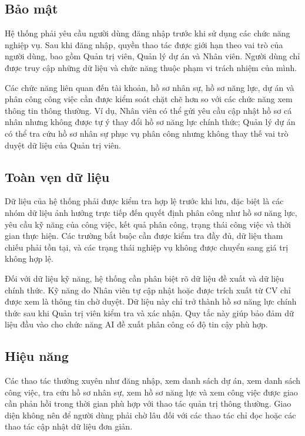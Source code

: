 \documentclass[../DoAn.tex]{subfiles}
\begin{document}
\subsection{Bảo mật}
\label{subsection:2.4.1}
Hệ thống phải yêu cầu người dùng đăng nhập trước khi sử dụng các chức năng nghiệp vụ. Sau khi đăng nhập, quyền thao tác được giới hạn theo vai trò của người dùng, bao gồm Quản trị viên, Quản lý dự án và Nhân viên. Người dùng chỉ được truy cập những dữ liệu và chức năng thuộc phạm vi trách nhiệm của mình.

Các chức năng liên quan đến tài khoản, hồ sơ nhân sự, hồ sơ năng lực, dự án và phân công công việc cần được kiểm soát chặt chẽ hơn so với các chức năng xem thông tin thông thường. Ví dụ, Nhân viên có thể gửi yêu cầu cập nhật hồ sơ cá nhân nhưng không được tự ý thay đổi hồ sơ năng lực chính thức; Quản lý dự án có thể tra cứu hồ sơ nhân sự phục vụ phân công nhưng không thay thế vai trò duyệt dữ liệu của Quản trị viên.

\subsection{Toàn vẹn dữ liệu}
\label{subsection:2.4.2}
Dữ liệu của hệ thống phải được kiểm tra hợp lệ trước khi lưu, đặc biệt là các nhóm dữ liệu ảnh hưởng trực tiếp đến quyết định phân công như hồ sơ năng lực, yêu cầu kỹ năng của công việc, kết quả phân công, trạng thái công việc và thời gian thực hiện. Các trường bắt buộc cần được kiểm tra đầy đủ, dữ liệu tham chiếu phải tồn tại, và các trạng thái nghiệp vụ không được chuyển sang giá trị không hợp lệ.

Đối với dữ liệu kỹ năng, hệ thống cần phân biệt rõ dữ liệu đề xuất và dữ liệu chính thức. Kỹ năng do Nhân viên tự cập nhật hoặc được trích xuất từ CV chỉ được xem là thông tin chờ duyệt. Dữ liệu này chỉ trở thành hồ sơ năng lực chính thức sau khi Quản trị viên kiểm tra và xác nhận. Quy tắc này giúp bảo đảm dữ liệu đầu vào cho chức năng AI đề xuất phân công có độ tin cậy phù hợp.

\subsection{Hiệu năng}
\label{subsection:2.4.3}
Các thao tác thường xuyên như đăng nhập, xem danh sách dự án, xem danh sách công việc, tra cứu hồ sơ nhân sự, xem hồ sơ năng lực và xem công việc được giao cần phản hồi trong thời gian phù hợp với thao tác quản trị thông thường. Giao diện không nên để người dùng phải chờ lâu đối với các thao tác chỉ đọc hoặc các thao tác cập nhật dữ liệu đơn giản.
\end{document}
